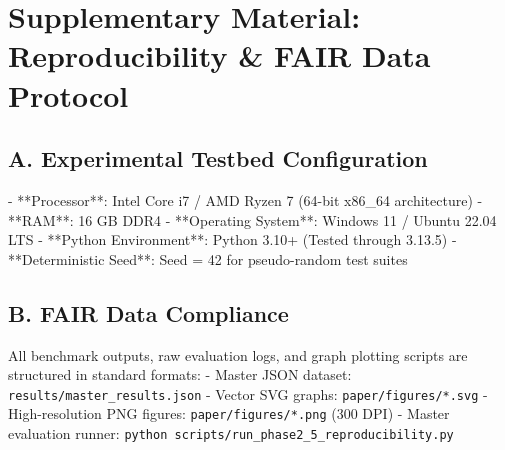 \section*{Supplementary Material: Reproducibility \& FAIR Data Protocol}
\label{sec:supplementary}

\subsection{A. Experimental Testbed Configuration}
- **Processor**: Intel Core i7 / AMD Ryzen 7 (64-bit x86\_64 architecture)
- **RAM**: 16 GB DDR4
- **Operating System**: Windows 11 / Ubuntu 22.04 LTS
- **Python Environment**: Python 3.10+ (Tested through 3.13.5)
- **Deterministic Seed**: Seed = 42 for pseudo-random test suites

\subsection{B. FAIR Data Compliance}
All benchmark outputs, raw evaluation logs, and graph plotting scripts are structured in standard formats:
- Master JSON dataset: \texttt{results/master\_results.json}
- Vector SVG graphs: \texttt{paper/figures/*.svg}
- High-resolution PNG figures: \texttt{paper/figures/*.png} (300 DPI)
- Master evaluation runner: \texttt{python scripts/run\_phase2\_5\_reproducibility.py}
